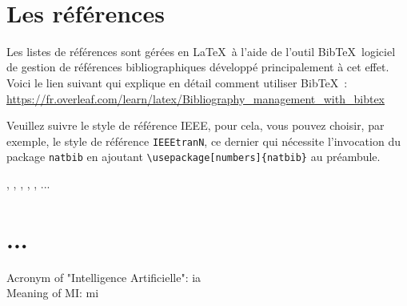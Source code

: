 ~~\\


\section{Les références}
Les listes de références sont gérées en \LaTeX\ à l'aide de l'outil Bib\TeX\, logiciel de gestion de références bibliographiques développé principalement à cet effet. Voici le lien suivant qui explique en détail comment utiliser Bib\TeX\ :  \url{https://fr.overleaf.com/learn/latex/Bibliography_management_with_bibtex}

Veuillez suivre le style de référence IEEE, pour cela, vous pouvez choisir, par exemple, le style de référence \verb|IEEEtranN|, ce dernier qui nécessite l'invocation du package \verb|natbib| en ajoutant \verb+\usepackage[numbers]{natbib}+ au préambule.

\cite{4}, \cite{2}, \cite{3}, \cite{5}, \cite{1}, ...


\section{...}
\noindent
Acronym of "Intelligence Artificielle": \acrshort{ia} \\
Meaning of MI: \acrlong{mi}
